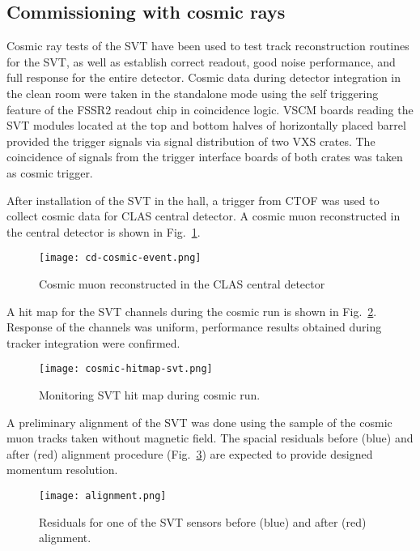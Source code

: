 \subsection{Commissioning with cosmic rays}

Cosmic ray tests of the SVT have been used to test track reconstruction routines for the SVT, as well as establish correct readout, good noise performance, and full response for the entire detector. Cosmic data during detector integration in the clean room were taken in the standalone mode using the self triggering feature of the FSSR2 readout chip in coincidence logic. VSCM boards reading the SVT modules located at the top and bottom halves of horizontally placed barrel provided the trigger signals via signal distribution of two VXS crates. The coincidence of  signals from the trigger interface boards of both crates was taken as cosmic trigger. 


After installation of the SVT in the hall, a trigger from CTOF was used to collect cosmic data for CLAS central detector. A cosmic muon reconstructed in the central detector is shown in Fig.~\ref{fig:cd-cosmic-event}.

\begin{figure}[hbt] 
\centering 
\texttt{[image: cd-cosmic-event.png]}
\caption{Cosmic muon reconstructed in the CLAS central detector}
\label{fig:cd-cosmic-event}
\end{figure}

A hit map for the SVT channels during the cosmic run is shown in Fig.~\ref{fig:cosmic-hitmap-svt}. Response of the channels was uniform, performance results obtained during tracker integration were confirmed.

\begin{figure}[hbt] 
\centering 
\texttt{[image: cosmic-hitmap-svt.png]}
\caption{Monitoring SVT hit map during cosmic run.}
\label{fig:cosmic-hitmap-svt}
\end{figure}

A preliminary alignment of the SVT was done using the sample of the cosmic muon tracks taken without magnetic field. The spacial residuals before (blue) and after (red) alignment procedure (Fig.~\ref{fig:alignment}) are expected to provide designed momentum resolution.

\begin{figure}[hbt] 
\centering 
\texttt{[image: alignment.png]}
\caption{Residuals for one of the SVT sensors before (blue) and after (red) alignment.}
\label{fig:alignment}
\end{figure}

